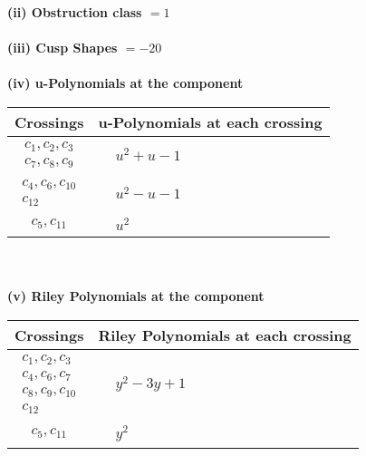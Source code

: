 \documentclass[1p]{elsarticle_modified}
\theoremstyle{definition}
\begin{document}
\flushleft \textbf{(ii) Obstruction class $= 1$}\\~\\
\flushleft \textbf{(iii) Cusp Shapes $= -20$}\\~\\
\newpage\renewcommand{\arraystretch}{1}
\flushleft \textbf{(iv) u-Polynomials at the component}\newline \\
\begin{tabular}{m{50pt}|m{274pt}}
Crossings & \hspace{64pt}u-Polynomials at each crossing \\
\hline $$\begin{aligned}c_{1},c_{2},c_{3}\\c_{7},c_{8},c_{9}\end{aligned}$$&$\begin{aligned}
&u^2+u-1
\end{aligned}$\\
\hline $$\begin{aligned}c_{4},c_{6},c_{10}\\c_{12}\end{aligned}$$&$\begin{aligned}
&u^2- u-1
\end{aligned}$\\
\hline $$\begin{aligned}c_{5},c_{11}\end{aligned}$$&$\begin{aligned}
&u^2
\end{aligned}$\\
\hline
\end{tabular}\\~\\
\newpage\renewcommand{\arraystretch}{1}
\flushleft \textbf{(v) Riley Polynomials at the component}\newline \\
\begin{tabular}{m{50pt}|m{274pt}}
Crossings & \hspace{64pt}Riley Polynomials at each crossing \\
\hline $$\begin{aligned}c_{1},c_{2},c_{3}\\c_{4},c_{6},c_{7}\\c_{8},c_{9},c_{10}\\c_{12}\end{aligned}$$&$\begin{aligned}
&y^2-3 y+1
\end{aligned}$\\
\hline $$\begin{aligned}c_{5},c_{11}\end{aligned}$$&$\begin{aligned}
&y^2
\end{aligned}$\\
\hline
\end{tabular}\\~\\
\end{document}
